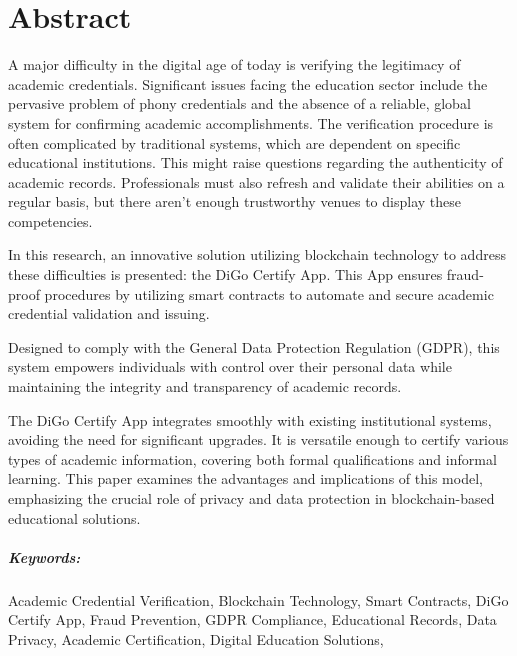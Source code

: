 %
% 
\chapter*{Abstract}\label{chap:abstract}

A major difficulty in the digital age of today is verifying the legitimacy of academic credentials. Significant issues facing the education sector include the pervasive problem of phony credentials and the absence of a reliable, global system for confirming academic accomplishments. The verification procedure is often complicated by traditional systems, which are dependent on specific educational institutions. This might raise questions regarding the authenticity of academic records. Professionals must also refresh and validate their abilities on a regular basis, but there aren't enough trustworthy venues to display these competencies.

In this research, an innovative solution utilizing blockchain technology to address these difficulties is presented: the DiGo Certify App. This App ensures fraud-proof procedures by utilizing smart contracts to automate and secure academic credential validation and issuing.

Designed to comply with the General Data Protection Regulation (GDPR), this system empowers individuals with control over their personal data while maintaining the integrity and transparency of academic records.

The DiGo Certify App integrates smoothly with existing institutional systems, avoiding the need for significant upgrades. It is versatile enough to certify various types of academic information, covering both formal qualifications and informal learning. This paper examines the advantages and implications of this model, emphasizing the crucial role of privacy and data protection in blockchain-based educational solutions.

\paragraph{Keywords:} Academic Credential Verification, Blockchain Technology, Smart Contracts, DiGo Certify App, Fraud Prevention, GDPR Compliance, Educational Records, Data Privacy, Academic Certification, Digital Education Solutions,
